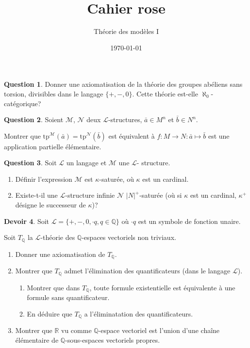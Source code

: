 \documentclass[a4paper, 12pt]{article}
\title{Cahier rose}
\author{Théorie des modèles I}
\date{\today}
\theoremstyle{definition} \newtheorem{quest}{Question}
\theoremstyle{definition} \newtheorem{dev}[quest]{Devoir}
\newcommand{\tp}[2]{\mathrm{tp}^{\mathscr{#1}}\left(#2\right)}
\begin{document}
\maketitle

\begin{quest}
  Donner une axiomatisation de la théorie des groupes abéliens
  sans torsion, divisibles dans le langage $\{+, -, 0\}$. Cette
  théorie est-elle $\aleph_0$-catégorique?
\end{quest}

\begin{quest}
  Soient $\mathscr M$, $\mathscr N$ deux $\mathscr L$-structures,
  $\bar{a}\in M^n$ et $\bar{b}\in N^n$.

  Montrer que $\tp{M}{\bar{a}} = \tp{N}{\bar{b}}$ est équivalent
  à $f: M\to N: \bar{a}\mapsto \bar{b}$ est une application
  partielle élémentaire.
\end{quest}

\begin{quest}
  Soit $\mathscr{L}$ un langage et $\mathscr{M}$ une $\mathscr L$-%
  structure.
  \begin{enumerate}
  \item Définir l'expression \og $\mathscr M$ est $\kappa$-saturée\fg{},
    où $\kappa$ est un cardinal.
  \item Existe-t-il une $\mathscr L$-structure infinie $\mathscr N$
    $|N|^+$-saturée (où si $\kappa$ est un cardinal, $\kappa^+$ désigne
    le successeur de $\kappa$)?
    
  \end{enumerate}
\end{quest}

\begin{dev}
  Soit $\mathscr L = \{ +, -, 0, \cdot q, q\in\mathbb Q\}$ où
  $\cdot q$ est un symbole de fonction unaire.

  Soit $T_{\mathbb Q}$ la $\mathscr L$-théorie des $\mathbb Q$-espaces
  vectoriels non triviaux.
  \begin{enumerate}
  \item Donner une axiomatisation de $T_{\mathbb Q}$.
  \item Montrer que $T_{\mathbb Q}$ admet l'élimination
    des quantificateurs (dans le langage $\mathscr L$).
    \begin{enumerate}
    \item Montrer que dans $T_{\mathbb Q}$, toute formule
      existentielle est équivalente à une formule sans quantificateur.
    \item En déduire que $T_{\mathbb Q}$ a l'éliminatation
      des quantificateurs.
    \end{enumerate}
  \item Montrer que $\mathbb R$ vu comme $\mathbb Q$-espace
    vectoriel est l'union d'une chaîne élémentaire de
    $\mathbb Q$-sous-espaces vectoriels propres.
  \end{enumerate}
\end{dev}
\end{document}
